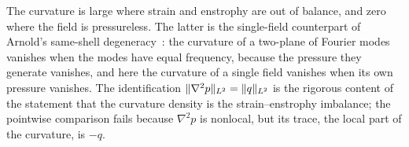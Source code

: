 The curvature is large where strain and enstrophy are out of balance, and zero
where the field is pressureless. The latter is the single-field counterpart of
Arnold's same-shell degeneracy~\cite{arnold-1998-top-met-hyd}: the curvature of a
two-plane of Fourier modes vanishes when the modes have equal frequency, because
the pressure they generate vanishes, and here the curvature of a single
field vanishes when its own pressure vanishes. The identification
$\lVert \nabla^2 p \rVert_{L^2} = \lVert q \rVert_{L^2}$ is the rigorous content of the
statement that the curvature density is the strain--enstrophy imbalance; the
pointwise comparison fails because $\nabla^2 p$ is nonlocal, but its trace, the
local part of the curvature, is $-q$.
